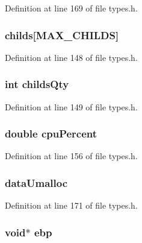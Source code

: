 Definition at line 169 of file types.h.

\hypertarget{structprocess__t_ad209165e7280e20b1fa6393e81ccca83}{
\subsubsection[{childs}]{ {\bf childs}\mbox{[}MAX\_\-CHILDS\mbox{]}}}
\label{structprocess__t_ad209165e7280e20b1fa6393e81ccca83}


Definition at line 148 of file types.h.

\hypertarget{structprocess__t_ae77317d364318c5912ead6b8114777bc}{
\subsubsection[{childsQty}]{\setlength{\rightskip}{0pt plus 5cm}int {\bf childsQty}}}
\label{structprocess__t_ae77317d364318c5912ead6b8114777bc}


Definition at line 149 of file types.h.

\hypertarget{structprocess__t_ac7aa08806d7be189514d2daaf83e5b72}{
\subsubsection[{cpuPercent}]{\setlength{\rightskip}{0pt plus 5cm}double {\bf cpuPercent}}}
\label{structprocess__t_ac7aa08806d7be189514d2daaf83e5b72}


Definition at line 156 of file types.h.

\hypertarget{structprocess__t_a19c110397be65fbeb224f20c1a21b76b}{
\subsubsection[{dataUmalloc}]{ {\bf dataUmalloc}}}
\label{structprocess__t_a19c110397be65fbeb224f20c1a21b76b}


Definition at line 171 of file types.h.

\hypertarget{structprocess__t_a27f83ceda788165817cb18a475c91062}{
\subsubsection[{ebp}]{\setlength{\rightskip}{0pt plus 5cm}void$\ast$ {\bf ebp}}}
\label{structprocess__t_a27f83ceda788165817cb18a475c91062}


